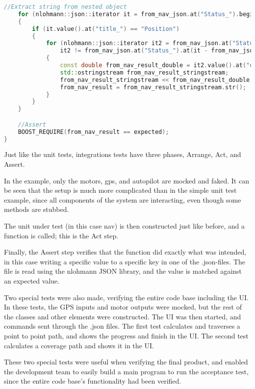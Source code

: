 \begin{lstlisting}[caption = {ReceiveNavigationTransmitter_test}, captionpos=b, label={lst:software_integration_test}, language=C++,firstnumber=1]
	//Extract string from nested object
	for (nlohmann::json::iterator it = from_nav_json.at("Status_").begin(); it != from_nav_json.at("Status_").end(); ++it)
	{
		if (it.value().at("title_") == "Position")
		{
			for (nlohmann::json::iterator it2 = from_nav_json.at("Status_").at(it - from_nav_json.at("Status_").begin()).at("items_").begin();
				it2 != from_nav_json.at("Status_").at(it - from_nav_json.at("Status_").begin()).at("items_").end(); ++it2)
			{
				const double from_nav_result_double = it2.value().at("data_");
				std::ostringstream from_nav_result_stringstream;
				from_nav_result_stringstream << from_nav_result_double;
				from_nav_result = from_nav_result_stringstream.str();
			}
		}
	}

	//Assert
	BOOST_REQUIRE(from_nav_result == expected);
}
\end{lstlisting}

Just like the unit tests, integrations tests have three phases, Arrange, Act, and Assert. 

In the example, only the motors, gps, and autopilot are mocked and faked. It can be seen that the setup is much more complicated than in the simple unit test example, since all components of the system are interacting, even though some methods are stubbed.

The unit under test (in this case nav) is then constructed just like before, and a function is called; this is the Act step. 

Finally, the Assert step verifies that the function did exactly what was intended, in this case writing a specific value to a specific key in one of the .json-files. The file is read using the nlohmann JSON library, and the value is matched against an expected value.

Two special tests were also made, verifying the entire code base including the UI. In these tests, the GPS inputs and motor outputs were mocked, but the rest of the classes and other elements were constructed. The UI was then started, and commands sent through the .json files. The first test calculates and traverses a point to point path, and shows the progress and finish in the UI. The second test calculates a coverage path and shows it in the UI.

These two special tests were useful when verifying the final product, and enabled the development team to easily build a main program to run the acceptance test, since the entire code base's functionality had been verified.